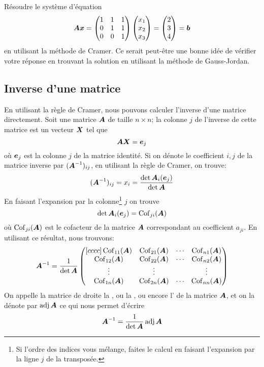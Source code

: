 \begin{exerciceC}
Résoudre le système d'équation
\[
\boldsymbol{A}\boldsymbol{x} = 
\begin{pmatrix}
1 & 1 & 1\\
0 & 1 & 1\\
0 & 0& 1
\end{pmatrix}
\begin{pmatrix}
x_1\\x_2\\x_3
\end{pmatrix}
=\begin{pmatrix}
2 \\ 3 \\ 4
\end{pmatrix}
=\boldsymbol{b}
\]
en utilisant la méthode de Cramer.  Ce serait peut-être une bonne idée de vérifier
votre réponse en trouvant la solution en utilisant la méthode de Gauss-Jordan.
\end{exerciceC}

\subsection{Inverse d'une matrice}
En utilisant la règle de Cramer, nous pouvons calculer l'inverse d'une matrice directement.
Soit une matrice $\boldsymbol{A}$ de taille $n\times  n$; la colonne $j$ de l'inverse de cette matrice
est un vecteur $\boldsymbol{X}$ tel que
\[
\boldsymbol{A} \boldsymbol{X} = \boldsymbol{e}_j
\]
où $\boldsymbol{e}_j$ est la colonne $j$ de la matrice identité.  Si on dénote le coefficient $i, j$ de la matrice inverse
par $(\boldsymbol{A}^{-1})_{ij}$, en utilisant la règle de Cramer, on trouve:
\[
(\boldsymbol{A}^{-1})_{ij} = x_i = \frac{\det \boldsymbol{A}_i(\boldsymbol{e}_j)}{\det\boldsymbol{A}}
\]
En faisant l'expansion par la colonne\footnote{Si l'ordre des indices vous mélange, faites le calcul en faisant
l'expansion par la ligne $j$ de la transposée.} $j$ on trouve
\[
\det \boldsymbol{A}_i(\boldsymbol{e}_j) = \operatorname{Cof}_{ji}(\boldsymbol{A})
\]
où $\operatorname{Cof}_{ji}(\boldsymbol{A})$ est le cofacteur de la matrice $\boldsymbol{A}$ correspondant au coefficient $a_{ji}$.
En utilisant ce résultat, nous trouvons:
\[
\boldsymbol{A}^{-1} = \frac{1}{\det\boldsymbol{A}} \begin{pmatrix}[cccc]
\operatorname{Cof}_{11}(\boldsymbol{A}) & \operatorname{Cof}_{21}(\boldsymbol{A}) & \cdots & \operatorname{Cof}_{n1}(\boldsymbol{A}) \\
\operatorname{Cof}_{12}(\boldsymbol{A}) & \operatorname{Cof}_{22}(\boldsymbol{A}) & \cdots & \operatorname{Cof}_{n2}(\boldsymbol{A}) \\
\vdots & \vdots & & \vdots \\
\operatorname{Cof}_{1n}(\boldsymbol{A}) & \operatorname{Cof}_{2n}(\boldsymbol{A}) & \cdots & \operatorname{Cof}_{nn}(\boldsymbol{A})
\end{pmatrix}
\]
On appelle la matrice de droite la , ou la , 
ou encore l' de la matrice $\boldsymbol{A}$, et on la dénote par $\operatorname{adj} \boldsymbol{A}$ 
ce qui nous permet d'écrire
\[
\boldsymbol{A}^{-1} = \frac{1}{\det\boldsymbol{A}} \operatorname{adj}\boldsymbol{A}
\]

